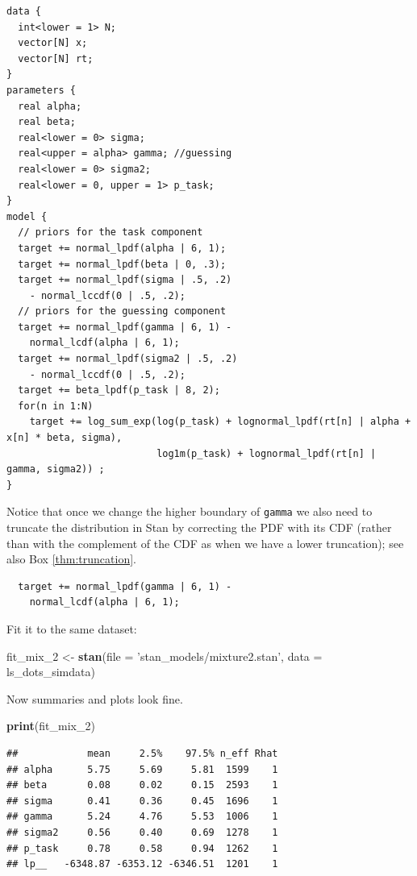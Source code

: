 \documentclass[12pt,]{krantz}
\newenvironment{Shaded}{\begin{snugshade}}{\end{snugshade}}
\newcommand{\KeywordTok}[1]{\textcolor[rgb]{0.13,0.29,0.53}{\textbf{#1}}}
\newcommand{\DataTypeTok}[1]{\textcolor[rgb]{0.13,0.29,0.53}{#1}}
\newcommand{\DecValTok}[1]{\textcolor[rgb]{0.00,0.00,0.81}{#1}}
\newcommand{\StringTok}[1]{\textcolor[rgb]{0.31,0.60,0.02}{#1}}
\newcommand{\NormalTok}[1]{#1}
\theoremstyle{definition}
\theoremstyle{definition}
\theoremstyle{definition}
\theoremstyle{remark}
\begin{document}
\begin{verbatim}
data {
  int<lower = 1> N;
  vector[N] x;
  vector[N] rt;
}
parameters {
  real alpha;
  real beta;
  real<lower = 0> sigma;
  real<upper = alpha> gamma; //guessing
  real<lower = 0> sigma2;
  real<lower = 0, upper = 1> p_task;
}
model {
  // priors for the task component
  target += normal_lpdf(alpha | 6, 1);
  target += normal_lpdf(beta | 0, .3);
  target += normal_lpdf(sigma | .5, .2)
    - normal_lccdf(0 | .5, .2);
  // priors for the guessing component
  target += normal_lpdf(gamma | 6, 1) -
    normal_lcdf(alpha | 6, 1);
  target += normal_lpdf(sigma2 | .5, .2)
    - normal_lccdf(0 | .5, .2);
  target += beta_lpdf(p_task | 8, 2);
  for(n in 1:N)
    target += log_sum_exp(log(p_task) + lognormal_lpdf(rt[n] | alpha + x[n] * beta, sigma),
                          log1m(p_task) + lognormal_lpdf(rt[n] | gamma, sigma2)) ;
}
\end{verbatim}

Notice that once we change the higher boundary of \texttt{gamma} we also
need to truncate the distribution in Stan by correcting the PDF with its
CDF (rather than with the complement of the CDF as when we have a lower
truncation); see also Box \ref{thm:truncation}.

\begin{verbatim}
  target += normal_lpdf(gamma | 6, 1) -
    normal_lcdf(alpha | 6, 1);
\end{verbatim}

Fit it to the same dataset:

\begin{Shaded}
\begin{Highlighting}[]
\NormalTok{fit_mix_}\DecValTok{2}\NormalTok{ <-}\StringTok{ }\KeywordTok{stan}\NormalTok{(}\DataTypeTok{file =} \StringTok{'stan_models/mixture2.stan'}\NormalTok{, }
               \DataTypeTok{data =}\NormalTok{ ls_dots_simdata)  }
\end{Highlighting}
\end{Shaded}

Now summaries and plots look fine.

\begin{Shaded}
\begin{Highlighting}[]
\KeywordTok{print}\NormalTok{(fit_mix_}\DecValTok{2}\NormalTok{) }
\end{Highlighting}
\end{Shaded}

\begin{verbatim}
##            mean     2.5%    97.5% n_eff Rhat
## alpha      5.75     5.69     5.81  1599    1
## beta       0.08     0.02     0.15  2593    1
## sigma      0.41     0.36     0.45  1696    1
## gamma      5.24     4.76     5.53  1006    1
## sigma2     0.56     0.40     0.69  1278    1
## p_task     0.78     0.58     0.94  1262    1
## lp__   -6348.87 -6353.12 -6346.51  1201    1
\end{verbatim}
\end{document}
